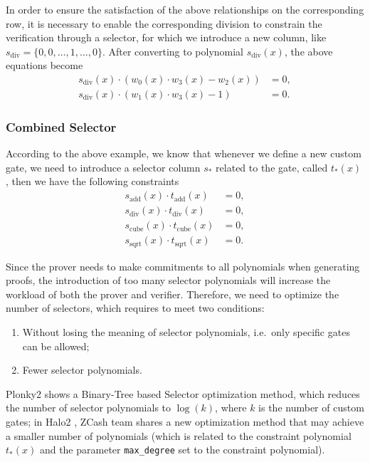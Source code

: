 In order to ensure the satisfaction of the above relationships on the corresponding row, it is necessary to enable the corresponding division to constrain the verification through a selector, for which we introduce a new column, like $s_\text{div}= \{0,0,\ldots,1,\ldots,0\}$. After converting to polynomial $s_\text{div}(x)$, the above equations become
\begin{align*}
s_\text{div}(x)\cdot(w_0(x) \cdot w_3(x) - w_2(x)) &= 0, \\
s_\text{div}(x)\cdot(w_1(x) \cdot w_3(x) - 1) &= 0.
\end{align*}

\subsubsection{Combined Selector}

According to the above example, we know that whenever we define a new custom gate, we need to introduce a selector column $s_*$ related to the gate, called $t_*(x)$, then we have the following constraints
\begin{align*}
s_\text{add}(x) \cdot t_\text{add}(x) &= 0, \\
s_\text{div}(x) \cdot t_\text{div}(x) &= 0, \\
s_\text{cube}(x) \cdot t_\text{cube}(x) &= 0, \\
s_\text{sqrt}(x) \cdot t_\text{sqrt}(x) &= 0.
\end{align*}

Since the prover needs to make commitments to all polynomials when generating proofs, the introduction of too many selector polynomials will increase the workload of both the prover and verifier. Therefore, we need to optimize the number of selectors, which requires to meet two conditions:
\begin{enumerate}
    \item Without losing the meaning of selector polynomials, i.e.\ only specific gates can be allowed;
    \item Fewer selector polynomials.
\end{enumerate}

Plonky2 \cite{website:plonky2} shows a Binary-Tree based Selector optimization method, which reduces the number of selector polynomials to $\log(k)$, where $k$ is the number of custom gates; in Halo2 \cite{website:halo2}, ZCash team shares a new optimization method that may achieve a smaller number of polynomials (which is related to the constraint polynomial $t_*(x)$ and the parameter \verb|max_degree| set to the constraint polynomial).

